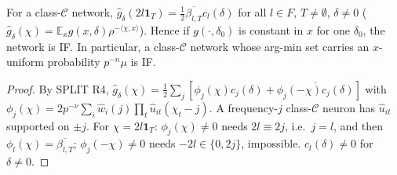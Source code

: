 \documentclass[11pt]{article}
\theoremstyle{remark}\newtheorem{remark}[theorem]{Remark}
\newcommand{\E}{\mathbb E}\newcommand{\R}{\mathbb R}\newcommand{\Re}{\operatorname{Re}}
\begin{document}
\begin{lemma}\label{l:fibre}
For a class-$\mathcal C$ network, $\hat g_\delta(2l\mathbf1_T)=\frac12\overline{\beta_{l,T}}c_l(\delta)$ for all $l\in F$, $T\ne\emptyset$, $\delta\ne0$
($\hat g_\delta(\chi)=\E_xg(x,\delta)\rho^{-\langle\chi,x\rangle}$). Hence if $g(\cdot,\delta_0)$ is constant in $x$ for one $\delta_0$, the network is IF.
In particular, a class-$\mathcal C$ network whose arg-min set carries an $x$-uniform probability $p^{-n}\mu$ is IF.
\end{lemma}
\begin{proof}
By SPLIT R4, $\hat g_\delta(\chi)=\frac12\sum_j[\phi_j(\chi)c_j(\delta)+\overline{\phi_j(-\chi)c_j(\delta)}]$ with
$\phi_j(\chi)=2p^{-\nu}\sum_i\hat w_i(j)\prod_t\hat u_{it}(\chi_t-j)$. A frequency-$j$ class-$\mathcal C$ neuron has $\hat u_{it}$ supported on $\pm j$.
For $\chi=2l\mathbf1_T$: $\phi_j(\chi)\ne0$ needs $2l\equiv2j$, i.e.\ $j=l$, and then $\phi_l(\chi)=\overline{\beta_{l,T}}$; $\phi_j(-\chi)\ne0$ needs $-2l\in\{0,2j\}$, impossible.
$c_l(\delta)\ne0$ for $\delta\ne0$.
\end{proof}
\end{document}
